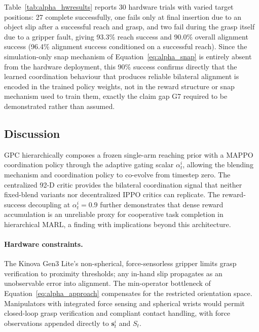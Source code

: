 Table~\ref{tab:alpha_hwresults} reports 30 hardware trials with varied target positions: 27 complete
successfully, one fails only at final insertion due to an object slip after a successful reach and
grasp, and two fail during the grasp itself due to a gripper fault, giving 93.3\% reach success and
90.0\% overall alignment success (96.4\% alignment success conditioned on a successful reach). Since
the simulation-only snap mechanism of Equation~\eqref{eq:alpha_snap} is entirely absent from the
hardware deployment, this 90\% success confirms directly that the learned coordination behaviour
that produces reliable bilateral alignment is encoded in the trained policy weights, not in the
reward structure or snap mechanism used to train them, exactly the claim gap G7 required to be
demonstrated rather than assumed.

\subsection{Discussion}\label{sec:alpha_discussion}

GPC hierarchically composes a frozen single-arm reaching prior with a MAPPO coordination policy
through the adaptive gating scalar $\alpha_t^i$, allowing the blending mechanism and coordination
policy to co-evolve from timestep zero. The centralized 92-D critic provides the bilateral
coordination signal that neither fixed-blend variants nor decentralized IPPO critics can replicate.
The reward-success decoupling at $\alpha_t^i = 0.9$ further demonstrates that dense reward
accumulation is an unreliable proxy for cooperative task completion in hierarchical MARL, a finding
with implications beyond this architecture.

\paragraph{Hardware constraints.} The Kinova Gen3 Lite's non-spherical, force-sensorless gripper
limits grasp verification to proximity thresholds; any in-hand slip propagates as an unobservable
error into alignment. The min-operator bottleneck of Equation~\eqref{eq:alpha_approach} compensates for
the restricted orientation space. Manipulators with integrated force sensing and spherical wrists
would permit closed-loop grasp verification and compliant contact handling, with force observations
appended directly to $\mathbf{s}^i_t$ and $S_t$.


